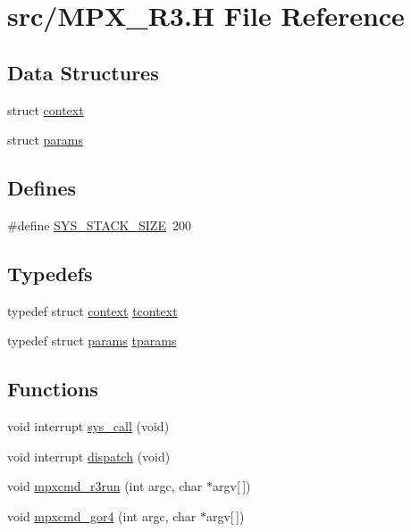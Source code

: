 \hypertarget{_m_p_x___r3_8_h}{
\section{src/MPX\_\-R3.H File Reference}
\label{_m_p_x___r3_8_h}
}
\subsection*{Data Structures}
\begin{DoxyCompactItemize}
\item 
struct \hyperlink{structcontext}{context}
\item 
struct \hyperlink{structparams}{params}
\end{DoxyCompactItemize}
\subsection*{Defines}
\begin{DoxyCompactItemize}
\item 
\#define \hyperlink{_m_p_x___r3_8_h_aca4404f2715f3a392a0d6bc0d73c0da0}{SYS\_\-STACK\_\-SIZE}~200
\end{DoxyCompactItemize}
\subsection*{Typedefs}
\begin{DoxyCompactItemize}
\item 
typedef struct \hyperlink{structcontext}{context} \hyperlink{_m_p_x___r3_8_h_adf3892bed3cfa413e3cd40a97bbfede5}{tcontext}
\item 
typedef struct \hyperlink{structparams}{params} \hyperlink{_m_p_x___r3_8_h_a3bd1cce7a253476fd26f767ea0c0fd3c}{tparams}
\end{DoxyCompactItemize}
\subsection*{Functions}
\begin{DoxyCompactItemize}
\item 
void interrupt \hyperlink{_m_p_x___r3_8_h_abeb8ddb92acb8fa40e902b98f2a1ccfb}{sys\_\-call} (void)
\item 
void interrupt \hyperlink{_m_p_x___r3_8_h_ad4150c832feb766384417ab7bae70089}{dispatch} (void)
\item 
void \hyperlink{_m_p_x___r3_8_h_a204c76cc251c17612164688f0b1272ad}{mpxcmd\_\-r3run} (int argc, char $\ast$argv\mbox{[}$\,$\mbox{]})
\item 
void \hyperlink{_m_p_x___r3_8_h_afff189bf2a21f1da2a30be81b57da08d}{mpxcmd\_\-gor4} (int argc, char $\ast$argv\mbox{[}$\,$\mbox{]})
\end{DoxyCompactItemize}


